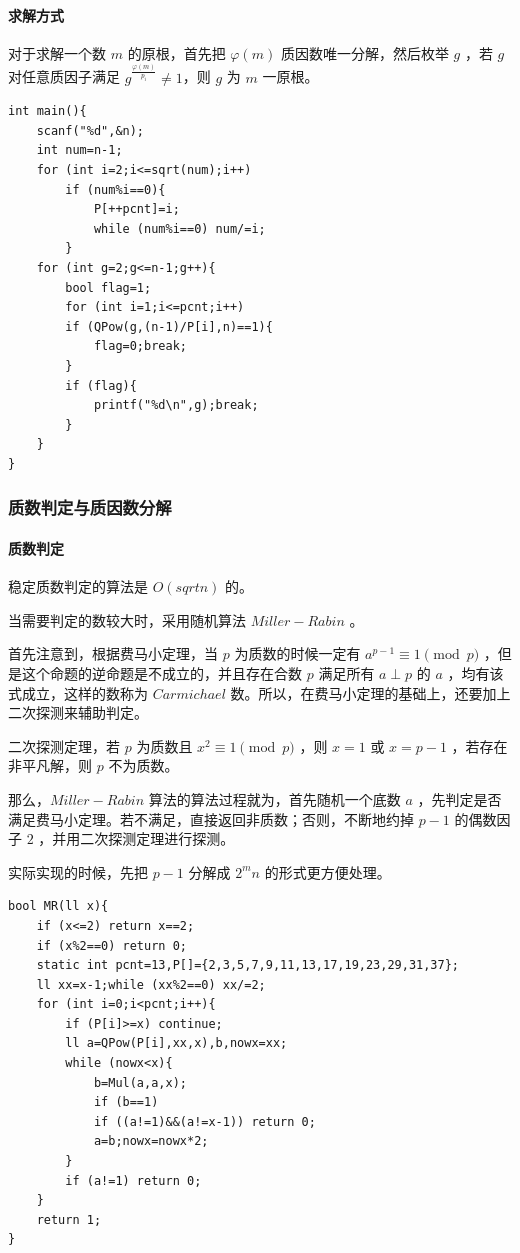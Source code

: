 \documentclass[UTF-8]{ctexart}
\begin{document}
	\paragraph{求解方式} 对于求解一个数 $m$ 的原根，首先把 $\varphi(m)$ 质因数唯一分解，然后枚举 $g$ ，若 $g$ 对任意质因子满足 $g^{\frac{\varphi(m)}{p_i}} \ne 1$，则 $g$ 为 $m$ 一原根。
\begin{verbatim}
int main(){
    scanf("%d",&n);
    int num=n-1;
    for (int i=2;i<=sqrt(num);i++)
        if (num%i==0){
            P[++pcnt]=i;
            while (num%i==0) num/=i;
        }
    for (int g=2;g<=n-1;g++){
        bool flag=1;
        for (int i=1;i<=pcnt;i++)
        if (QPow(g,(n-1)/P[i],n)==1){
            flag=0;break;
        }
        if (flag){
            printf("%d\n",g);break;
        }
    }
}
\end{verbatim}
\subsubsection{质数判定与质因数分解}
\paragraph{质数判定}
稳定质数判定的算法是 $O(sqrt{n})$ 的。

当需要判定的数较大时，采用随机算法 $Miller-Rabin$ 。

首先注意到，根据费马小定理，当 $p$ 为质数的时候一定有 $a^{p-1} \equiv 1 \pmod{p}$ ，但是这个命题的逆命题是不成立的，并且存在合数 $p$ 满足所有 $a \perp p$ 的 $a$ ，均有该式成立，这样的数称为 $Carmichael$ 数。所以，在费马小定理的基础上，还要加上二次探测来辅助判定。

二次探测定理，若 $p$ 为质数且 $x^2 \equiv 1 \pmod{p}$ ，则 $x=1$ 或 $x=p-1$ ，若存在非平凡解，则 $p$ 不为质数。

那么，$Miller-Rabin$ 算法的算法过程就为，首先随机一个底数 $a$ ，先判定是否满足费马小定理。若不满足，直接返回非质数；否则，不断地约掉 $p-1$ 的偶数因子 $2$ ，并用二次探测定理进行探测。

实际实现的时候，先把 $p-1$ 分解成 $2^mn$ 的形式更方便处理。
\begin{verbatim}
bool MR(ll x){
    if (x<=2) return x==2;
    if (x%2==0) return 0;
    static int pcnt=13,P[]={2,3,5,7,9,11,13,17,19,23,29,31,37};
    ll xx=x-1;while (xx%2==0) xx/=2;
    for (int i=0;i<pcnt;i++){
        if (P[i]>=x) continue;
        ll a=QPow(P[i],xx,x),b,nowx=xx;
        while (nowx<x){
            b=Mul(a,a,x);
            if (b==1)
            if ((a!=1)&&(a!=x-1)) return 0;
            a=b;nowx=nowx*2;
        }
        if (a!=1) return 0;
    }
    return 1;
}
\end{verbatim}
\end{document}
